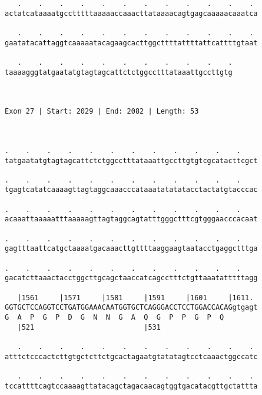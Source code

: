 \documentclass{article}
\begin{document}
\begin{Verbatim}
   .    .    .    .    .    .    .    .    .    .    .    . 
actatcataaaatgcctttttaaaaaccaaacttataaaacagtgagcaaaaacaaatca
                                                            
   .    .    .    .    .    .    .    .    .    .    .    . 
gaatatacattaggtcaaaaatacagaagcacttggcttttattttattcattttgtaat
                                                            
   .    .    .    .    .    .    .    .    .    .    .
taaaagggtatgaatatgtagtagcattctctggcctttataaattgccttgtg
                                                      
                                                      
 
Exon 27 | Start: 2029 | End: 2082 | Length: 53



.    .    .    .    .    .    .    .    .    .    .    .    
tatgaatatgtagtagcattctctggcctttataaattgccttgtgtcgcatacttcgct
                                                            
.    .    .    .    .    .    .    .    .    .    .    .    
tgagtcatatcaaaagttagtaggcaaacccataaatatatatacctactatgtacccac
                                                            
.    .    .    .    .    .    .    .    .    .    .    .    
acaaattaaaaatttaaaaagttagtaggcagtatttgggctttcgtgggaacccacaat
                                                            
.    .    .    .    .    .    .    .    .    .    .    .    
gagtttaattcatgctaaaatgacaaacttgttttaaggaagtaatacctgaggctttga
                                                            
.    .    .    .    .    .    .    .    .    .    .    .    
gacatcttaaactacctggcttgcagctaaccatcagcctttctgttaaatatttttagg
                                                            
   |1561     |1571     |1581     |1591     |1601     |1611. 
GGTGCTCCAGGTCCTGATGGAAACAATGGTGCTCAGGGACCTCCTGGACCACAGgtgagt
G  A  P  G  P  D  G  N  N  G  A  Q  G  P  P  G  P  Q        
   |521                          |531                       
  
   .    .    .    .    .    .    .    .    .    .    .    . 
atttctcccactcttgtgctcttctgcactagaatgtatatagtcctcaaactggccatc
                                                            
   .    .    .    .    .    .    .    .    .    .    .    . 
tccattttcagtccaaaagttatacagctagacaacagtggtgacatacgttgctattta
                                                            

\end{Verbatim}
\end{document}
